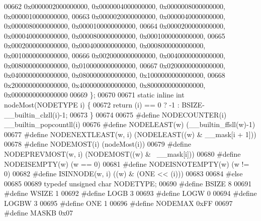 \begin{DoxyCode}
00662         0x0000002000000000, 0x0000004000000000, 0x0000008000000000, 0x0000010000000000,
00663         0x0000020000000000, 0x0000040000000000, 0x0000080000000000, 0x0000100000000000,
00664         0x0000200000000000, 0x0000400000000000, 0x0000800000000000, 0x0001000000000000,
00665         0x0002000000000000, 0x0004000000000000, 0x0008000000000000, 0x0010000000000000,
00666         0x0020000000000000, 0x0040000000000000, 0x0080000000000000, 0x0100000000000000,
00667         0x0200000000000000, 0x0400000000000000, 0x0800000000000000, 0x1000000000000000,
00668         0x2000000000000000, 0x4000000000000000, 0x8000000000000000, 0x0000000000000000
00669 \};
00670 
00671 \textcolor{keyword}{static} \textcolor{keyword}{inline} \textcolor{keywordtype}{int} nodeMost(NODETYPE i) \{
00672         \textcolor{keywordflow}{return} (i) == 0 ? -1 : BSIZE-\_\_builtin\_clzll(i)-1;
00673 \}
00674 
00675 \textcolor{preprocessor}{#define NODECOUNTER(i) \_\_builtin\_popcountll(i)}
00676 \textcolor{preprocessor}{#define NODELEAST(w) (\_\_builtin\_ffsll(w)-1)}
00677 \textcolor{preprocessor}{#define NODENEXTLEAST(w, i) (NODELEAST((w) & \_\_mask[i + 1]))}
00678 \textcolor{preprocessor}{#define NODEMOST(i) (nodeMost(i))}
00679 \textcolor{preprocessor}{#define NODEPREVMOST(w, i) (NODEMOST((w) & ~\_\_mask[i]))}
00680 \textcolor{preprocessor}{#define NODEISEMPTY(w) (w == 0)}
00681 \textcolor{preprocessor}{#define NODEISNOTEMPTY(w) (w != 0)}
00682 \textcolor{preprocessor}{#define ISINNODE(w, i) ((w) & (ONE << (i)))                                                     }
00683 \textcolor{preprocessor}{}
00684 \textcolor{preprocessor}{#else}
00685 
00689 \textcolor{keyword}{typedef} \textcolor{keywordtype}{unsigned} \textcolor{keywordtype}{char} NODETYPE;                         
00690 \textcolor{preprocessor}{#define BSIZE 8                                                         }
00691 \textcolor{preprocessor}{#define WSIZE 1                                                         }
00692 \textcolor{preprocessor}{#define LOGB 3                                                          }
00693 \textcolor{preprocessor}{#define LOGW 0                                                          }
00694 \textcolor{preprocessor}{#define LOGBW 3                                                         }
00695 \textcolor{preprocessor}{#define ONE 1                                                           }
00696 \textcolor{preprocessor}{#define NODEMAX 0xFF                                            }
00697 \textcolor{preprocessor}{#define MASKB 0x07                                                      }

\end{DoxyCode}
